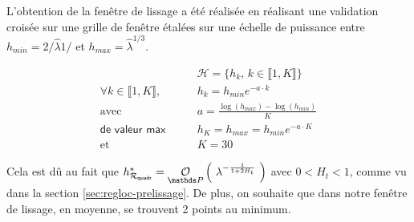 L'obtention de la fenêtre de lissage a été réalisée en réalisant une validation croisée sur une grille de fenêtre étalées sur une échelle de puissance entre $h_{min} = 2 / \widehat \lambda 1 / $ et $h_{max} = \widehat \lambda^{1/3}$.

\begin{align*}
	                                                 & \mathcal H = \bigl\{ h_k, \, k \in \llbracket 1, K \rrbracket \bigr\}
	\\
	\forall k \in \llbracket 1, K \rrbracket, \qquad & h_k = h_{min} e^{ - a \cdot k }
	\\
	\text{avec } \qquad                              & a = \frac{\log \left( h_{max} \right) - \log(h_{min})}{K}
	\\
	\textsf{de valeur max} \qquad                    & h_K = h_{max} = h_{min} e^{ - a \cdot K }
	\\
	\text{et } \qquad                                & K = 30
\end{align*}

Cela est dû au fait que $h^*_{\mathcal R_{\textsf{quadr}}} = \grandop{ \lambda^{- \frac 1 {1 + 2H_t}} }$ avec $0<H_t<1$, comme vu dans la section \ref{sec:regloc-prelissage}. De plus, on souhaite que dans notre fenêtre de lissage, en moyenne, se trouvent 2 points au minimum. 

